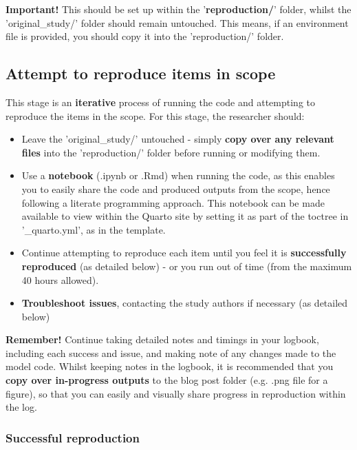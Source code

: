 \textbf{Important!} This should be set up within the '\textbf{reproduction/}' folder, whilst the 'original\_study/' folder should remain untouched. This means, if an environment file is provided, you should copy it into the 'reproduction/' folder.

\vspace{0.5cm}
\subsection{Attempt to reproduce items in scope}

This stage is an \textbf{iterative} process of running the code and attempting to reproduce the items in the scope. For this stage, the researcher should:
\begin{itemize}
    \item Leave the 'original\_study/' untouched - simply \textbf{copy over any relevant files} into the 'reproduction/' folder before running or modifying them.
    \item Use a \textbf{notebook} (.ipynb or .Rmd) when running the code, as this enables you to easily share the code and produced outputs from the scope, hence following a literate programming approach. This notebook can be made available to view within the Quarto site by setting it as part of the toctree in '\_quarto.yml', as in the template.
    \item Continue attempting to reproduce each item until you feel it is \textbf{successfully reproduced} (as detailed below) - or you run out of time (from the maximum 40 hours allowed).
    \item \textbf{Troubleshoot issues}, contacting the study authors if necessary (as detailed below)
\end{itemize}

\textbf{Remember!} Continue taking detailed notes and timings in your logbook, including each success and issue, and making note of any changes made to the model code. Whilst keeping notes in the logbook, it is recommended that you \textbf{copy over in-progress outputs} to the blog post folder (e.g. .png file for a figure), so that you can easily and visually share progress in reproduction within the log.

\vspace{0.5cm}
\subsubsection{Successful reproduction}

